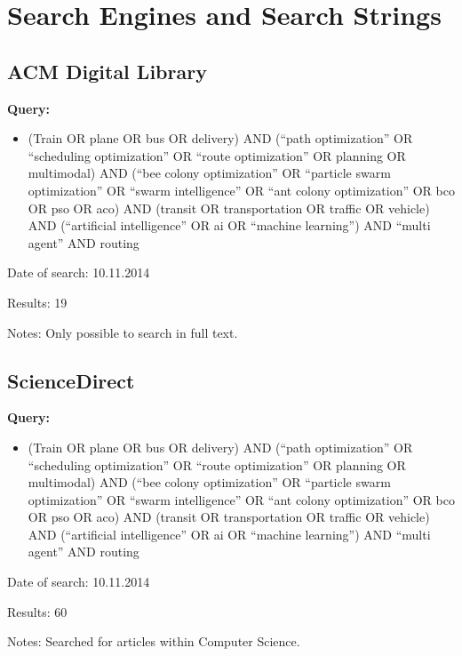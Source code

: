 \chapter{Search Engines and Search Strings}
\section{ACM Digital Library}
\textbf{Query:}
\begin{itemize}
\item (Train OR plane OR bus OR delivery) AND (``path optimization'' OR ``scheduling optimization'' OR ``route optimization'' OR planning OR multimodal) AND (``bee colony optimization'' OR ``particle swarm optimization'' OR ``swarm intelligence'' OR ``ant colony optimization'' OR bco OR pso OR aco) AND (transit OR transportation OR traffic OR vehicle) AND (``artificial intelligence'' OR ai OR ``machine learning'') AND ``multi agent'' AND routing
\end{itemize}
\par Date of search: 10.11.2014
\par Results: 19
\par Notes: Only possible to search in full text. 

\section{ScienceDirect}
\textbf{Query:}
\begin{itemize}
\item (Train OR plane OR bus OR delivery) AND (``path optimization'' OR ``scheduling optimization'' OR ``route optimization'' OR planning OR multimodal) AND (``bee colony optimization'' OR ``particle swarm optimization'' OR ``swarm intelligence'' OR ``ant colony optimization'' OR bco OR pso OR aco) AND (transit OR transportation OR traffic OR vehicle) AND (``artificial intelligence'' OR ai OR ``machine learning'') AND ``multi agent'' AND routing
\end{itemize}
\par Date of search: 10.11.2014
\par Results: 60
\par Notes: Searched for articles within Computer Science.  


